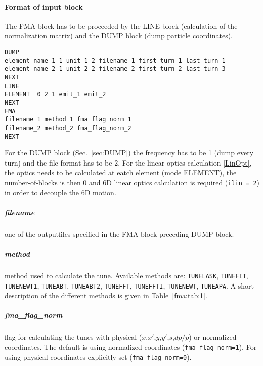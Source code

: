 \documentclass[a4paper,11pt]{report}
\begin{document}
\paragraph{Format of input block}
The FMA block has to be proceeded by the LINE block (calculation of the normalization matrix) and the DUMP block (dump particle coordinates).
\begin{verbatim}
DUMP
element_name_1 1 unit_1 2 filename_1 first_turn_1 last_turn_1
element_name_2 1 unit_2 2 filename_2 first_turn_2 last_turn_3
NEXT
LINE
ELEMENT  0 2 1 emit_1 emit_2
NEXT
FMA
filename_1 method_1 fma_flag_norm_1
filename_2 method_2 fma_flag_norm_2
NEXT
\end{verbatim}
For the DUMP block (Sec.~\ref{sec:DUMP}) the frequency has to be 1 (dump every turn) and the file format has to be 2. For the linear optics calculation \ref{LinOpt}, the optics needs to be calculated at eatch element (mode ELEMENT), the number-of-blocks is then 0 and 6D linear optics calculation is required (\verb|ilin = 2|) in order to decouple the 6D motion. 

\subparagraph{filename}
one of the outputfiles specified in the FMA block preceding DUMP block.
\subparagraph{method}
method used to calculate the tune. Available methods are: \verb|TUNELASK|, \verb|TUNEFIT|, \verb|TUNENEWT1|, \verb|TUNEABT|, \verb|TUNEABT2|, \verb|TUNEFFT|, \verb|TUNEFFTI|, \verb|TUNENEWT|, \verb|TUNEAPA|. A short description of the different methods is given in Table~\ref{fma:tab:1}.
\subparagraph{fma\_flag\_norm}
flag for calculating the tunes with physical ($x$,$x'$,$y$,$y'$,$s$,$dp/p$) or normalized coordinates. The default is using normalized coordinates (\verb|fma_flag_norm=1|). For using physical coordinates explicitly set (\verb|fma_flag_norm=0|).
\end{document}
